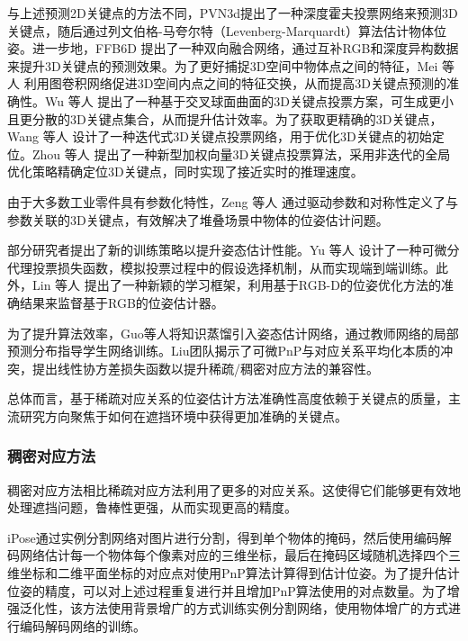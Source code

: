\par 与上述预测2D关键点的方法不同，PVN3d\cite{he2020pvn3d}提出了一种深度霍夫投票网络来预测3D关键点，随后通过列文伯格-马夸尔特（Levenberg-Marquardt）算法\cite{Levenberg_Marquardt}估计物体位姿。进一步地，FFB6D\cite{he2021ffb6d} 提出了一种双向融合网络，通过互补RGB和深度异构数据来提升3D关键点的预测效果。为了更好捕捉3D空间中物体点之间的特征，Mei 等人\cite{mei2022spatial} 利用图卷积网络促进3D空间内点之间的特征交换，从而提高3D关键点预测的准确性。Wu 等人\cite{wu2022vote} 提出了一种基于交叉球面曲面的3D关键点投票方案，可生成更小且更分散的3D关键点集合，从而提升估计效率。为了获取更精确的3D关键点，Wang 等人\cite{wang2023kvnet} 设计了一种迭代式3D关键点投票网络，用于优化3D关键点的初始定位。Zhou 等人\cite{zhou2023deep} 提出了一种新型加权向量3D关键点投票算法，采用非迭代的全局优化策略精确定位3D关键点，同时实现了接近实时的推理速度。

\par 由于大多数工业零件具有参数化特性，Zeng 等人\cite{zeng2021parametricnet} 通过驱动参数和对称性定义了与参数关联的3D关键点，有效解决了堆叠场景中物体的位姿估计问题。

\par 部分研究者提出了新的训练策略以提升姿态估计性能。Yu 等人\cite{yu20206dof} 设计了一种可微分代理投票损失函数，模拟投票过程中的假设选择机制，从而实现端到端训练。此外，Lin 等人\cite{lin2022learning} 提出了一种新颖的学习框架，利用基于RGB-D的位姿优化方法的准确结果来监督基于RGB的位姿估计器。

\par 为了提升算法效率，Guo等人\cite{guo2023knowledge}将知识蒸馏引入姿态估计网络，通过教师网络的局部预测分布指导学生网络训练。Liu团队\cite{liu2023linear}揭示了可微PnP与对应关系平均化本质的冲突，提出线性协方差损失函数以提升稀疏/稠密对应方法的兼容性。

\par 总体而言，基于稀疏对应关系的位姿估计方法准确性高度依赖于关键点的质量，主流研究方向聚焦于如何在遮挡环境中获得更加准确的关键点。

\subsubsection{稠密对应方法}\label{稠密对应方法}
\par 稠密对应方法相比稀疏对应方法利用了更多的对应关系。这使得它们能够更有效地处理遮挡问题，鲁棒性更强，从而实现更高的精度。

\par iPose\cite{hosseini2019ipose}通过实例分割网络对图片进行分割，得到单个物体的掩码，然后使用编码解码网络估计每一个物体每个像素对应的三维坐标，最后在掩码区域随机选择四个三维坐标和二维平面坐标的对应点对使用PnP算法计算得到估计位姿。为了提升估计位姿的精度，可以对上述过程重复进行并且增加PnP算法使用的对点数量。为了增强泛化性，该方法使用背景增广的方式训练实例分割网络，使用物体增广的方式进行编码解码网络的训练。

